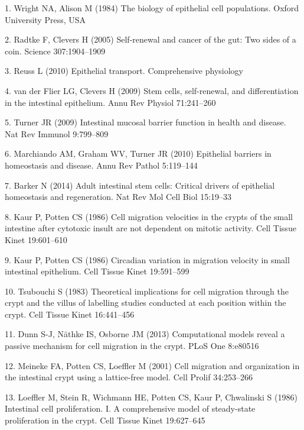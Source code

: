 \documentclass[10pt,letterpaper]{article}
\begin{document}
\hypertarget{refs}{}
\hypertarget{ref-Wright1984-kw}{}
1. Wright NA, Alison M (1984) The biology of epithelial cell
populations. Oxford University Press, USA

\hypertarget{ref-Radtke2005-dh}{}
2. Radtke F, Clevers H (2005) Self-renewal and cancer of the gut: Two
sides of a coin. Science 307:1904--1909

\hypertarget{ref-Reuss2010-fn}{}
3. Reuss L (2010) Epithelial transport. Comprehensive physiology

\hypertarget{ref-Van_der_Flier2009-hw}{}
4. van der Flier LG, Clevers H (2009) Stem cells, self-renewal, and
differentiation in the intestinal epithelium. Annu Rev Physiol
71:241--260

\hypertarget{ref-Turner2009-ei}{}
5. Turner JR (2009) Intestinal mucosal barrier function in health and
disease. Nat Rev Immunol 9:799--809

\hypertarget{ref-Marchiando2010-th}{}
6. Marchiando AM, Graham WV, Turner JR (2010) Epithelial barriers in
homeostasis and disease. Annu Rev Pathol 5:119--144

\hypertarget{ref-Barker2014-xu}{}
7. Barker N (2014) Adult intestinal stem cells: Critical drivers of
epithelial homeostasis and regeneration. Nat Rev Mol Cell Biol 15:19--33

\hypertarget{ref-Kaur1986-xq}{}
8. Kaur P, Potten CS (1986) Cell migration velocities in the crypts of
the small intestine after cytotoxic insult are not dependent on mitotic
activity. Cell Tissue Kinet 19:601--610

\hypertarget{ref-Kaur1986-je}{}
9. Kaur P, Potten CS (1986) Circadian variation in migration velocity in
small intestinal epithelium. Cell Tissue Kinet 19:591--599

\hypertarget{ref-Tsubouchi1983-tk}{}
10. Tsubouchi S (1983) Theoretical implications for cell migration
through the crypt and the villus of labelling studies conducted at each
position within the crypt. Cell Tissue Kinet 16:441--456

\hypertarget{ref-Dunn2013-tg}{}
11. Dunn S-J, Näthke IS, Osborne JM (2013) Computational models reveal a
passive mechanism for cell migration in the crypt. PLoS One 8:e80516

\hypertarget{ref-Meineke2001-xi}{}
12. Meineke FA, Potten CS, Loeffler M (2001) Cell migration and
organization in the intestinal crypt using a lattice-free model. Cell
Prolif 34:253--266

\hypertarget{ref-Loeffler1986-ej}{}
13. Loeffler M, Stein R, Wichmann HE, Potten CS, Kaur P, Chwalinski S
(1986) Intestinal cell proliferation. I. A comprehensive model of
steady-state proliferation in the crypt. Cell Tissue Kinet 19:627--645
\end{document}
